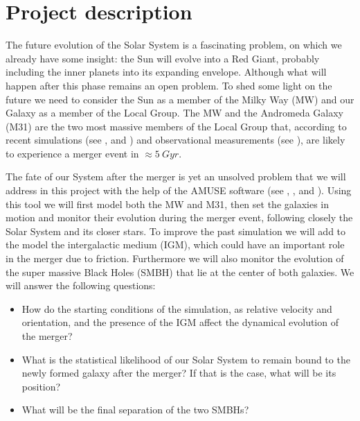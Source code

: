 \documentclass[10pt,english]{article}
\begin{document}
\section{Project description}
\label{project}
The future evolution of the Solar System is a fascinating problem, on which we already have some insight: the Sun will evolve into a Red Giant, probably including the inner planets into its expanding envelope. Although what will happen after this phase remains an open problem. To shed some light on the future we need to consider the Sun as a member of the Milky Way (MW) and our Galaxy as a member of the Local Group. The MW and the Andromeda Galaxy (M31) are the two most massive members of the Local Group that, according to recent simulations (see \textcite{Cox_2008}, \textcite{van_der_Marel_2019} and \textcite{Schiavi_2019}) and observational measurements (see \textcite{van_der_Marel_2012b}), are likely to experience a merger event in \(\approx 5\: Gyr\).\par
\smallskip
The fate of our System after the merger is yet an unsolved problem that we will address in this project with the help of the AMUSE software (see \textcite{Portegies_Zwart_McMillan_2018}, \textcite{Portegies_Zwart_2013}, \textcite{Pelupessy_2013} and \textcite{Portegies_Zwart_2009}). Using this tool we will first model both the MW and M31, then set the galaxies in motion and monitor their evolution during the merger event, following closely the Solar System and its closer stars. To improve the past simulation we will add to the model the intergalactic medium (IGM), which could have an important role in the merger due to friction. Furthermore we will also monitor the evolution of the super massive Black Holes (SMBH) that lie at the center of both galaxies. We will answer the following questions:
\begin{itemize}
    \item How do the starting conditions of the simulation, as relative velocity and orientation, and the presence of the IGM affect the dynamical evolution of the merger?
    \item What is the statistical likelihood of our Solar System to remain bound to the newly formed galaxy after the merger? If that is the case, what will be its position?
    \item What will be the final separation of the two SMBHs?
\end{itemize}
\par
\smallskip
\end{document}
